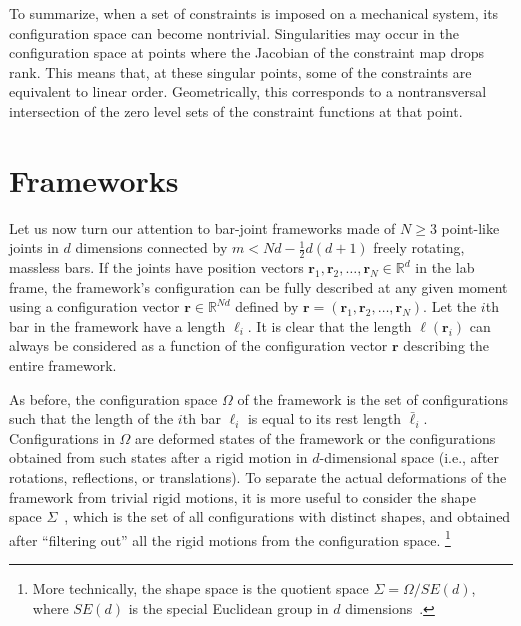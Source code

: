 To summarize, when a set of constraints is imposed on a mechanical system, its configuration space can become nontrivial.
Singularities may occur in the configuration space at points where the Jacobian of the constraint map drops rank.
This means that, at these singular points, some of the constraints are equivalent to linear order.
Geometrically, this corresponds to a nontransversal intersection of the zero level sets of the constraint functions at that point.

\section{Frameworks}
\label{sec:frameworks}

Let us now turn our attention to bar-joint frameworks made of $N \geq 3$ point-like joints in $d$ dimensions connected by $m < Nd - \tfrac{1}{2}d(d+1)$ freely rotating, massless bars.
If the joints have position vectors $\bm{r}_1, \bm{r}_2, \ldots, \bm{r}_{N} \in \mathbb{R}^d$ in the lab frame, the framework's configuration can be fully described at any given moment using a configuration vector $\bm{r}\in\mathbb{R}^{N d}$ defined by $\bm{r} = (\bm{r}_1, \bm{r}_2, \ldots, \bm{r}_{N})$.
Let the $i$th bar in the framework have a length $\ell_{i}$.
It is clear that the length $\ell(\bm{r}_{i})$ can always be considered as a function of the configuration vector $\bm{r}$ describing the entire framework.

As before, the configuration space $\Omega$ of the framework is the set of configurations such that the length of the $i$th bar $\ell_{i}$ is equal to its rest length $\bar{\ell}_{i}$.
Configurations in $\Omega$ are deformed states of the framework or the configurations obtained from such states after a rigid motion in $d$-dimensional space (i.e., after rotations, reflections, or translations).
To separate the actual deformations of the framework from trivial rigid motions, it is more useful to consider the shape space $\Sigma$~\cite{kendall1989,mezey1993,kendall1999}, which is the set of all configurations with distinct shapes, and
obtained after ``filtering out'' all the rigid motions from the configuration space.%
\footnote{More technically, the shape space is the quotient space $\Sigma = \Omega/SE(d)$, where $SE(d)$ is the special Euclidean group in $d$ dimensions~\cite{littlejohn1995}.}

